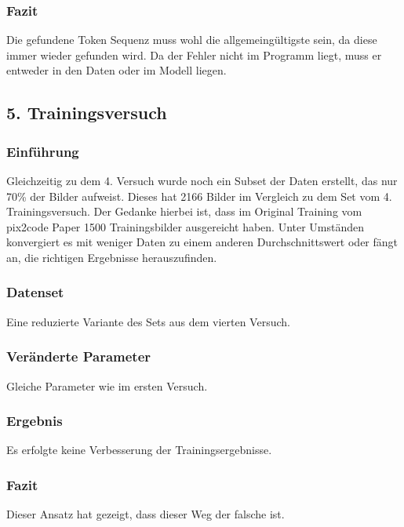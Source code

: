 \documentclass[pdftex,a4paper,halfparskip, article]{scrartcl}
\begin{document}
\subsubsection*{Fazit}

Die gefundene Token Sequenz muss wohl die allgemeingültigste sein, da diese immer wieder gefunden wird. Da der Fehler nicht im Programm liegt, muss er entweder in den Daten oder im Modell liegen. 

\subsection{5. Trainingsversuch}

\subsubsection*{Einführung}

Gleichzeitig zu dem 4. Versuch wurde noch ein Subset der Daten erstellt, das nur 70\% der Bilder aufweist. Dieses hat 2166 Bilder im Vergleich zu dem Set vom 4. Trainingsversuch. Der Gedanke hierbei ist, dass im Original Training vom pix2code Paper 1500 Trainingsbilder ausgereicht haben. Unter Umständen konvergiert es mit weniger Daten zu einem anderen Durchschnittswert oder fängt an, die richtigen Ergebnisse herauszufinden.

\subsubsection*{Datenset}
Eine reduzierte Variante des Sets aus dem vierten Versuch.

\subsubsection*{Veränderte Parameter}

Gleiche Parameter wie im ersten Versuch.

\subsubsection*{Ergebnis}

Es erfolgte keine Verbesserung der Trainingsergebnisse.

\subsubsection*{Fazit}

Dieser Ansatz hat gezeigt, dass dieser Weg der falsche ist.
\end{document}
